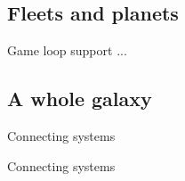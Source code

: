 \documentclass{beamer}
\begin{document}
\subsection{Fleets and planets}
\begin{frame}{Game loop support}
...
\end{frame}
\subsection{A whole galaxy}
\begin{frame}{Connecting systems}
\begin{center}
\noindent{}
\end{center}
\end{frame}
\begin{frame}{Connecting systems}
\begin{center}
\noindent{}
\end{center}
\end{frame}
\end{document}
